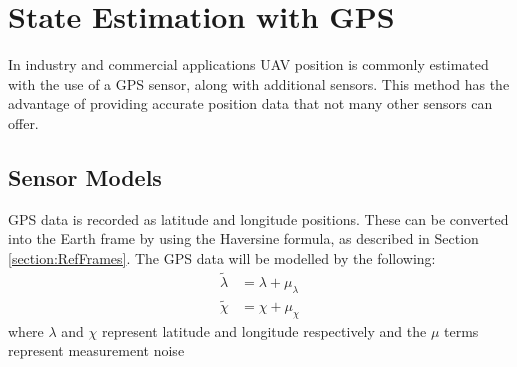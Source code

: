 \section{State Estimation with GPS}\label{section:GPS_EKF}
In industry and commercial applications UAV position is commonly estimated with the use of a GPS sensor, along with additional sensors. This method has the advantage of providing accurate position data that not many other sensors can offer.

\subsection{Sensor Models}\label{section:GPS_sensorModels}
GPS data is recorded as latitude and longitude positions. These can be converted into the Earth frame by using the Haversine formula, as described in Section \ref{section:RefFrames}. The GPS data will be modelled by the following:
\begin{equation}
\begin{split}
\tilde{\lambda}&=\lambda+\mu_{\lambda}\\
\tilde{\chi}&=\chi +\mu_{\chi}
\end{split}
\end{equation}
where $\lambda$ and $\chi$ represent latitude and longitude respectively and the $\mu$ terms represent measurement noise

